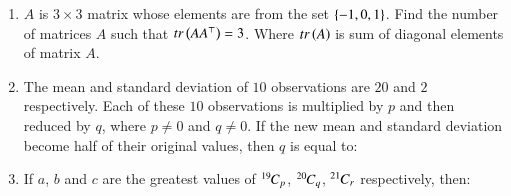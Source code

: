 \documentclass[journal,12pt,onecolumn]{IEEEtran}
\theoremstyle{remark}
\begin{document}
\begin{enumerate}
\item $A$ is $3\times 3$ matrix whose elements are from the set $\left\{-1,0,1\right\}$. Find the number of matrices $A$ such that $tr\left(AA^\top\right)=3$. Where $tr\left(A\right)$ is sum of diagonal elements of matrix $A$.

\hfill{}
\begin{enumerate}
\end{enumerate}

\item The mean and standard deviation of $10$ observations are $20$ and $2$ respectively. Each of these $10$ observations is multiplied by $p$ and then reduced by $q$, where $p\neq 0$ and $q\neq 0$. If the new mean and standard deviation become half of their original values, then $q$ is equal to:

\hfill{}
\begin{enumerate}
\end{enumerate}

\item If $a$, $b$ and $c$ are the greatest values of ${{}^{19}\mkern-1muC_{p}}$, ${{}^{20}\mkern-1muC_{q}}$, ${{}^{21}\mkern-1muC_{r}}$ respectively, then:

\hfill{}
\begin{enumerate}
\end{enumerate}


\end{enumerate}
\end{document}
